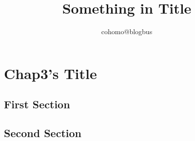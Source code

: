\documentclass{article}
\begin{document}
\title{Something in Title}
\author{cohomo@blogbus}
\date{}
\maketitle
\else
\chapter{Chap3's Title}
\fi
\section{First Section}
\section{Second Section}
\ifx\allfiles\undefined
\end{document}

